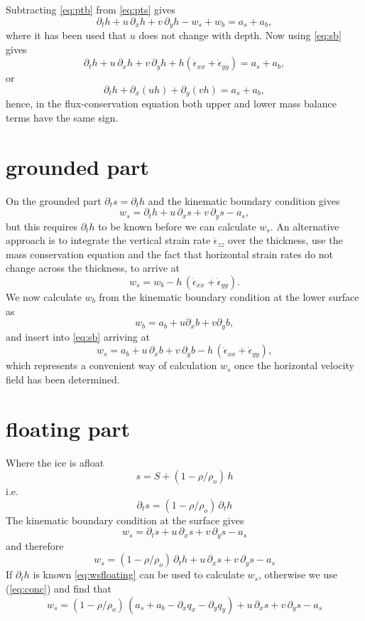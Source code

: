 \documentclass[10pt,a4paper]{book}
\newcommand{\p}{\partial}
\newcommand{\exx}{\dot{\epsilon}_{xx}}
\newcommand{\eyy}{\dot{\epsilon}_{yy}}
\newcommand{\ezz}{\dot{\epsilon}_{zz}}
\begin{document}
Subtracting \eqref{eq:ptb} from \eqref{eq:pts} gives
\[
\p_t h+ u \, \p_x h +v \, \p_y h -w_s + w_b=a_s+a_b ,
\]
where it has been used that $u$ does not change with depth. Now using \eqref{eq:sb} gives
\[
\p_t h+ u \, \p_x h + v \, \p_y h +h ( \exx + \eyy)=a_s+a_b,
\]
or
\begin{equation}
\p_t h+ \p_x (u h) + \p_y ( v h)=a_s+a_b,
\label{eq:conc}
\end{equation}
hence, in the flux-conservation equation both upper and lower mass balance terms have the same sign. 




\section{grounded part}

On the grounded part $\p_t s =\p_t h$ and the kinematic boundary condition gives
\begin{equation}
w_s=\p_t h  + u \, \p_x s + v \, \p_y s -a_s ,
\label{eq:wsg}
\end{equation}
but this requires $\p_t h$ to be known before we can calculate $w_s$. An alternative approach is to 
integrate the vertical strain rate $\ezz$ over the thickness, use the mass conservation equation and
the fact that horizontal strain rates do not change across the thickness, to arrive at
\begin{equation} 
w_s= w_b-h \, ( \exx + \eyy) .
\label{eq:sb} \end{equation}
We now calculate $w_b$ from the kinematic boundary condition at the lower surface as
\[
w_b=a_b + u \p_x b + v \p_y b ,
\]
and insert into \eqref{eq:sb} arriving at
\begin{equation} 
w_s= a_b + u \, \p_x b + v \, \p_y b -h \, ( \exx + \eyy) ,
\label{eq:wsgrounded} 
\end{equation}
which represents a convenient way of calculation $w_s$ once the horizontal velocity field has been determined.



\section{floating part}
Where the ice is afloat 
\[
s = S+(1-\rho/\rho_o) \, h 
\]
i.e.\
\[
\p_t s =  (1-\rho/\rho_o) \, \p_t h 
\]
The kinematic boundary condition at the surface gives
\[
w_s=\p_t s + u \, \p_x s + v \, \p_y s -a_s 
\]
and therefore
\begin{equation}
w_s=(1-\rho/\rho_o) \, \p_t h  + u \, \p_x s + v \, \p_y s -a_s 
\label{eq:wsfloating}
\end{equation}
If $\p_t h$ is known \eqref{eq:wsfloating} can be used to calculate $w_s$, otherwise
we use (\ref{eq:conc}) and find that
\begin{equation}
w_s=(1-\rho/\rho_o) \, (a_s+a_b - \p_x q_x - \p_y q_y)  + u \, \p_x s + v \, \p_y s -a_s 
\label{eq:wsfloating2}
\end{equation}
\end{document}
